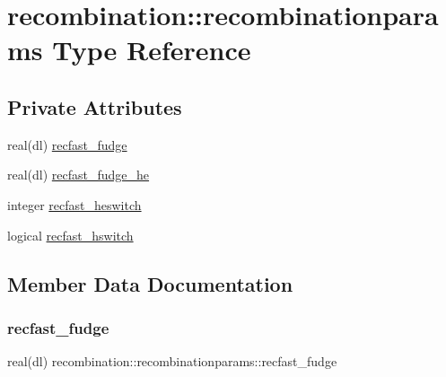 \hypertarget{structrecombination_1_1recombinationparams}{}\section{recombination\+:\+:recombinationparams Type Reference}
\label{structrecombination_1_1recombinationparams}
\subsection*{Private Attributes}
\begin{DoxyCompactItemize}
\item 
real(dl) \mbox{\hyperlink{structrecombination_1_1recombinationparams_aa7f9219f48dc61c6bfeafdd27d171c52}{recfast\+\_\+fudge}}
\item 
real(dl) \mbox{\hyperlink{structrecombination_1_1recombinationparams_a3ada3753c7ecb35b8ed9f115de88b380}{recfast\+\_\+fudge\+\_\+he}}
\item 
integer \mbox{\hyperlink{structrecombination_1_1recombinationparams_a2ad0d163cea5c88ea5ac87c8ae81c20d}{recfast\+\_\+heswitch}}
\item 
logical \mbox{\hyperlink{structrecombination_1_1recombinationparams_a2cc191215540a5142a77ab8683739e1d}{recfast\+\_\+hswitch}}
\end{DoxyCompactItemize}


\subsection{Member Data Documentation}
\mbox{\label{structrecombination_1_1recombinationparams_aa7f9219f48dc61c6bfeafdd27d171c52}} 
\subsubsection{\texorpdfstring{recfast\+\_\+fudge}{recfast\_fudge}}
{\footnotesize\ttfamily real(dl) recombination\+::recombinationparams\+::recfast\+\_\+fudge\hspace{0.3cm}{\ttfamily [private]}}

\mbox{\label{structrecombination_1_1recombinationparams_a3ada3753c7ecb35b8ed9f115de88b380}} 
